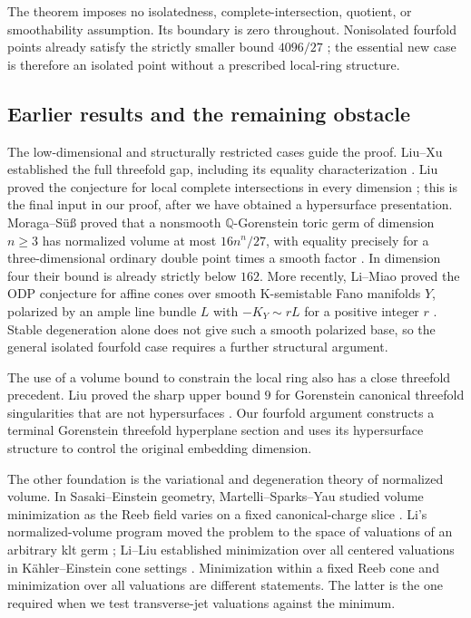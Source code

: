 \documentclass[11pt]{article}
\theoremstyle{definition}
\theoremstyle{remark}
\numberwithin{equation}{section}
\newcommand{\Q}{\mathbb Q}
\begin{document}
The theorem imposes no isolatedness, complete-intersection, quotient, or smoothability assumption. Its boundary is zero throughout. Nonisolated fourfold points already satisfy the strictly smaller bound \(4096/27\) \cite[Corollary~2.18]{Liu}; the essential new case is therefore an isolated point without a prescribed local-ring structure.

\subsection{Earlier results and the remaining obstacle}

The low-dimensional and structurally restricted cases guide the proof. Liu--Xu established the full threefold gap, including its equality characterization \cite[Theorem~1.3]{LiuXu}. Liu proved the conjecture for local complete intersections in every dimension \cite[Theorem~2.12]{Liu}; this is the final input in our proof, after we have obtained a hypersurface presentation. Moraga--S\"u\ss{} proved that a nonsmooth \(\Q\)-Gorenstein toric germ of dimension \(n\ge3\) has normalized volume at most \(16n^n/27\), with equality precisely for a three-dimensional ordinary double point times a smooth factor \cite[Theorem~2]{MoragaSuess}. In dimension four their bound is already strictly below \(162\). More recently, Li--Miao proved the ODP conjecture for affine cones over smooth K-semistable Fano manifolds \(Y\), polarized by an ample line bundle \(L\) with \(-K_Y\sim rL\) for a positive integer \(r\) \cite[Theorem~4.17]{LiMiao}. Stable degeneration alone does not give such a smooth polarized base, so the general isolated fourfold case requires a further structural argument.

The use of a volume bound to constrain the local ring also has a close threefold precedent. Liu proved the sharp upper bound \(9\) for Gorenstein canonical threefold singularities that are not hypersurfaces \cite[Theorem~1.1]{LiuThreefoldBounds}. Our fourfold argument constructs a terminal Gorenstein threefold hyperplane section and uses its hypersurface structure to control the original embedding dimension.

The other foundation is the variational and degeneration theory of normalized volume. In Sasaki--Einstein geometry, Martelli--Sparks--Yau studied volume minimization as the Reeb field varies on a fixed canonical-charge slice \cite{MSY}. Li's normalized-volume program moved the problem to the space of valuations of an arbitrary klt germ \cite{Li}; Li--Liu established minimization over all centered valuations in K\"ahler--Einstein cone settings \cite{LiLiu}. Minimization within a fixed Reeb cone and minimization over all valuations are different statements. The latter is the one required when we test transverse-jet valuations against the minimum.
\end{document}
